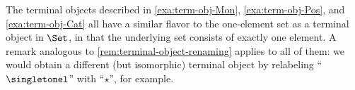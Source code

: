 \begin{remark}
    The terminal objects described in \cref{exa:term-obj-Mon}, \cref{exa:term-obj-Pos}, and \cref{exa:term-obj-Cat} all have a similar flavor to the one-element set as a terminal object in $\Set$, in that the underlying set consists of exactly one element. A remark analogous to \cref{rem:terminal-object-renaming} applies to all of them: we would obtain a different (but isomorphic) terminal object by relabeling ``$\singletonel$'' with ``$\star$'', for example.
\end{remark}



